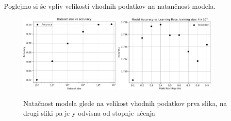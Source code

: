 Poglejmo si še vpliv velikosti vhodnih podatkov na natančnost modela.
\begin{figure}
    \centering
    \includegraphics[width=0.45\textwidth]{../pdf/model_accuracy_vs_data_size.pdf}
    \includegraphics[width=0.45\textwidth]{../pdf/model_accuracy_vs_learning_rate.pdf}
    \caption{Natačnost modela glede na velikost vhodnih podatkov prva slika, na drugi sliki pa je y odvisna od stopnje učenja\label{fig:catboost-size}}
\end{figure}


